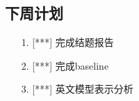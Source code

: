 \documentclass[11pt]{article}
\begin{document}
\begin{CJK}{UTF8}{gkai}
\section{下周计划}
\begin{itemize}
\item [1.] [***] 完成结题报告
\item [2.] [***] 完成baseline
\item [3.] [***] 英文模型表示分析
\end{itemize}
%
%
%

\end{CJK}
\end{document}
